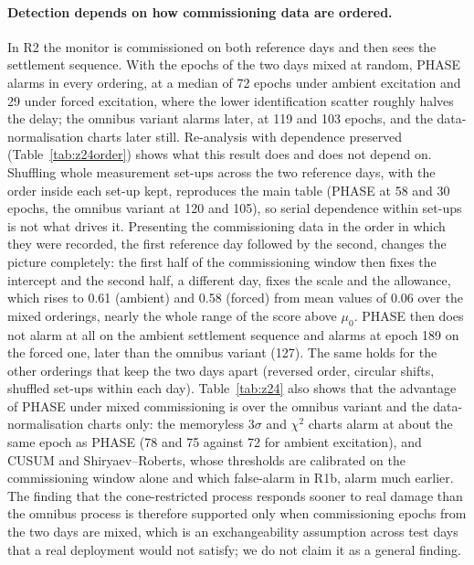 \documentclass[12pt,a4paper]{article}
\newenvironment{revblock}{}{}
\newenvironment{revblock}{\begingroup\color{revcol}}{\endgroup}
\begin{document}
\begin{revblock}
\paragraph{Detection depends on how commissioning data are ordered.} In R2 the monitor is commissioned on both reference days and then sees the settlement sequence. With the epochs of the two days mixed at random, PHASE alarms in every ordering, at a median of 72 epochs under ambient excitation and 29 under forced excitation, where the lower identification scatter roughly halves the delay; the omnibus variant alarms later, at 119 and 103 epochs, and the data-normalisation charts later still. Re-analysis with dependence preserved (Table~\ref{tab:z24order}) shows what this result does and does not depend on. Shuffling whole measurement set-ups across the two reference days, with the order inside each set-up kept, reproduces the main table (PHASE at 58 and 30 epochs, the omnibus variant at 120 and 105), so serial dependence within set-ups is not what drives it. Presenting the commissioning data in the order in which they were recorded, the first reference day followed by the second, changes the picture completely: the first half of the commissioning window then fixes the intercept and the second half, a different day, fixes the scale and the allowance, which rises to 0.61 (ambient) and 0.58 (forced) from mean values of 0.06 over the mixed orderings, nearly the whole range of the score above $\mu_0$. PHASE then does not alarm at all on the ambient settlement sequence and alarms at epoch 189 on the forced one, later than the omnibus variant (127). The same holds for the other orderings that keep the two days apart (reversed order, circular shifts, shuffled set-ups within each day). Table~\ref{tab:z24} also shows that the advantage of PHASE under mixed commissioning is over the omnibus variant and the data-normalisation charts only: the memoryless $3\sigma$ and $\chi^2$ charts alarm at about the same epoch as PHASE (78 and 75 against 72 for ambient excitation), and CUSUM and Shiryaev--Roberts, whose thresholds are calibrated on the commissioning window alone and which false-alarm in R1b, alarm much earlier. The finding that the cone-restricted process responds sooner to real damage than the omnibus process is therefore supported only when commissioning epochs from the two days are mixed, which is an exchangeability assumption across test days that a real deployment would not satisfy; we do not claim it as a general finding.


\end{revblock}
\end{document}
